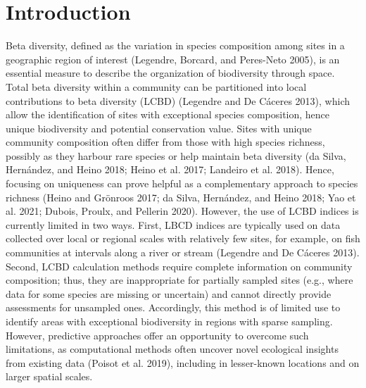 \documentclass[11pt]{article}
\begin{document}
\clearpage
\linenumbers
\pagestyle{normal}

\hypertarget{introduction}{%
\section{Introduction}\label{introduction}}

Beta diversity, defined as the variation in species composition among
sites in a geographic region of interest (Legendre, Borcard, and
Peres-Neto 2005), is an essential measure to describe the organization
of biodiversity through space. Total beta diversity within a community
can be partitioned into local contributions to beta diversity (LCBD)
(Legendre and De Cáceres 2013), which allow the identification of sites
with exceptional species composition, hence unique biodiversity and
potential conservation value. Sites with unique community composition
often differ from those with high species richness, possibly as they
harbour rare species or help maintain beta diversity (da Silva,
Hernández, and Heino 2018; Heino et al. 2017; Landeiro et al. 2018).
Hence, focusing on uniqueness can prove helpful as a complementary
approach to species richness (Heino and Grönroos 2017; da Silva,
Hernández, and Heino 2018; Yao et al. 2021; Dubois, Proulx, and Pellerin
2020). However, the use of LCBD indices is currently limited in two
ways. First, LBCD indices are typically used on data collected over
local or regional scales with relatively few sites, for example, on fish
communities at intervals along a river or stream (Legendre and De
Cáceres 2013). Second, LCBD calculation methods require complete
information on community composition; thus, they are inappropriate for
partially sampled sites (e.g., where data for some species are missing
or uncertain) and cannot directly provide assessments for unsampled
ones. Accordingly, this method is of limited use to identify areas with
exceptional biodiversity in regions with sparse sampling. However,
predictive approaches offer an opportunity to overcome such limitations,
as computational methods often uncover novel ecological insights from
existing data (Poisot et al. 2019), including in lesser-known locations
and on larger spatial scales.
\end{document}
